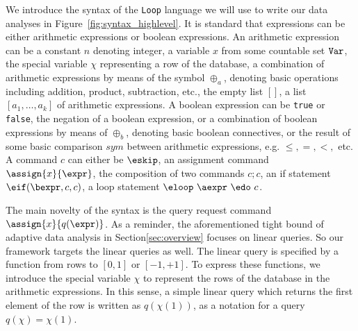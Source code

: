 We introduce the syntax of the {\tt Loop} language we will use to write our data analyses in Figure~\ref{fig:syntax_highlevel}.
It is standard that expressions can be either arithmetic expressions or boolean expressions.
An arithmetic expression can be a  constant $n$ denoting integer, a variable $x$ from some countable set $\tt Var$, the special variable $\chi$ representing a row of the database, a combination of arithmetic expressions by means of the symbol $\oplus_a$, denoting basic operations including addition, product, subtraction, etc., the empty list $[]$, a list $[a_1,\ldots,a_k]$ of arithmetic expressions.
%
A boolean expression can be {\tt true} or {\tt false}, the negation of
a boolean expression, or a combination of boolean expressions by means of $\oplus_b$, denoting basic boolean connectives, or the result of some basic comparison $sym$ between arithmetic expressions, e.g. $\leq,=,<,$ etc. 
% 
%
  A command $c$ can either be $\eskip$, an assignment command $\assign{x}{\expr}$, the composition of two commands $c;c$, an if statement $\eif(\bexpr, c, c)$, a loop statement  $\eloop ~ \aexpr ~ \edo ~ c $.
 
 The main novelty of the syntax is the query request command $\assign{x}{q(\expr)}$. As a reminder, the aforementioned tight bound of adaptive data analysis in Section\ref{sec:overview} focuses on linear queries. So our framework targets the linear queries as well. The linear query is specified by a function from rows to $[0,1]$ or $[-1,+1]$. To express these functions, we introduce the special variable $\chi$ to represent the rows of the database in the arithmetic expressions. In this sense, a simple linear query which returns the first element of the row is written as $q(\chi(1))$, as a notation for a query $q(\chi) = \chi(1)$.  
 
 



